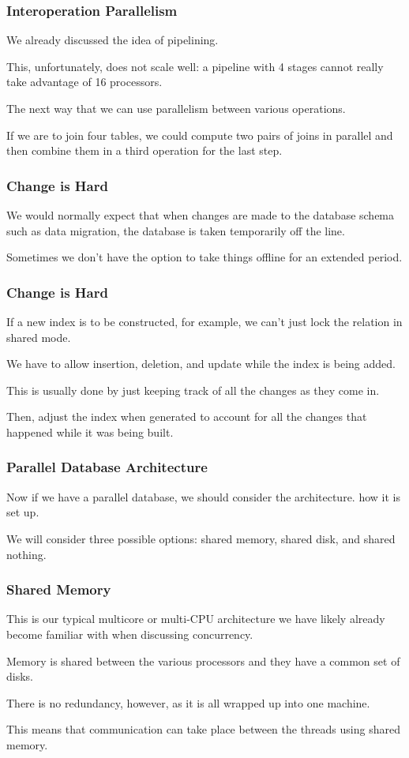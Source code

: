 \begin{frame}
\frametitle{Interoperation Parallelism }

We already discussed the idea of pipelining.

This, unfortunately, does not scale well: a pipeline with 4 stages cannot really take advantage of 16 processors.

The next way that we can use parallelism between various operations. 

If we are to join four tables, we could compute two pairs of joins in parallel and then combine them in a third operation for the last step. 

\end{frame}



\begin{frame}
\frametitle{Change is Hard}

We would normally expect that when changes are made to the database schema such as data migration, the database is taken temporarily off the line.

Sometimes we don't have the option to take things offline for an extended period.

\end{frame}

\begin{frame}
\frametitle{Change is Hard}

If a new index is to be constructed, for example, we can't just lock the relation in shared mode.

We have to allow insertion, deletion, and update while the index is being added. 

This is usually done by just keeping track of all the changes as they come in.

Then, adjust the index when generated to account for all the changes that happened while it was being built.

\end{frame}

\begin{frame}
\frametitle{Parallel Database Architecture}

Now if we have a parallel database, we should consider the architecture. how it is set up.

 We will consider three possible options: shared memory, shared disk, and shared nothing.


\end{frame}

\begin{frame}
\frametitle{Shared Memory}

This is our typical multicore or multi-CPU architecture we have likely already become familiar with when discussing concurrency. 

Memory is shared between the various processors and they have a common set of disks. 

There is no redundancy, however, as it is all wrapped up into one machine.

This means that communication can take place between the threads using shared memory.

\end{frame}

